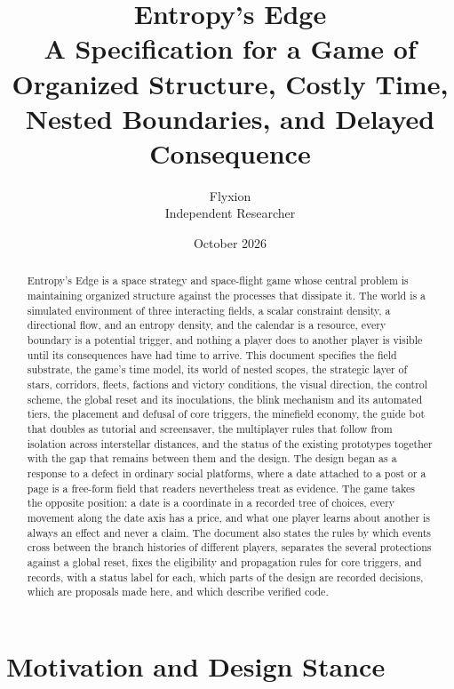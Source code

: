 \documentclass[11pt]{article}
\title{Entropy's Edge\\[0.4em]\large A Specification for a Game of Organized Structure, Costly Time, Nested Boundaries, and Delayed Consequence}
\author{Flyxion\\Independent Researcher}
\date{October 2026}
\begin{document}
\maketitle

\begin{abstract}
\noindent Entropy's Edge is a space strategy and space-flight game whose central problem is maintaining organized structure against the processes that dissipate it. The world is a simulated environment of three interacting fields, a scalar constraint density, a directional flow, and an entropy density, and the calendar is a resource, every boundary is a potential trigger, and nothing a player does to another player is visible until its consequences have had time to arrive. This document specifies the field substrate, the game's time model, its world of nested scopes, the strategic layer of stars, corridors, fleets, factions and victory conditions, the visual direction, the control scheme, the global reset and its inoculations, the blink mechanism and its automated tiers, the placement and defusal of core triggers, the minefield economy, the guide bot that doubles as tutorial and screensaver, the multiplayer rules that follow from isolation across interstellar distances, and the status of the existing prototypes together with the gap that remains between them and the design. The design began as a response to a defect in ordinary social platforms, where a date attached to a post or a page is a free-form field that readers nevertheless treat as evidence. The game takes the opposite position: a date is a coordinate in a recorded tree of choices, every movement along the date axis has a price, and what one player learns about another is always an effect and never a claim. The document also states the rules by which events cross between the branch histories of different players, separates the several protections against a global reset, fixes the eligibility and propagation rules for core triggers, and records, with a status label for each, which parts of the design are recorded decisions, which are proposals made here, and which describe verified code.
\end{abstract}

\tableofcontents
\newpage

\section{Motivation and Design Stance}
\end{document}
